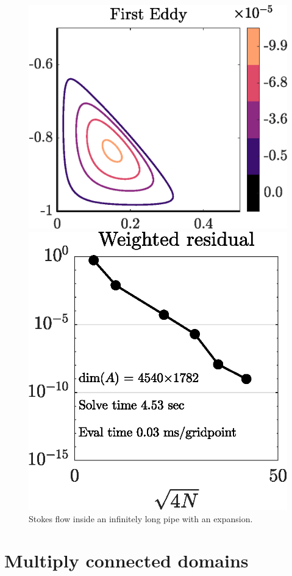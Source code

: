 \begin{figure}[H]
	\vspace{2em}
	\begin{minipage}{0.45\linewidth}
		\centering
		\includegraphics[width=\linewidth]{Figures/chan_eddy}
	\end{minipage}
	\hfill
	\begin{minipage}{0.45\linewidth}
		\centering
		\includegraphics[width=\linewidth]{Figures/chan_conv}
	\end{minipage}
	

	\caption{Stokes flow inside an infinitely long pipe with an expansion.}
	\label{fig:chan}
\end{figure} 

\section{Multiply connected domains \label{sec:multiply}}


